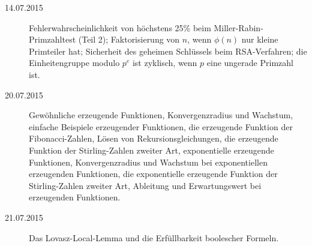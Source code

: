 \documentclass{mywork}
\begin{document}
\begin{description}
    \item[14.07.2015]
        Fehlerwahrscheinlichkeit von höchstens 25\% beim Miller-Rabin-Primzahltest (Teil 2); Faktorisierung von $n$, wenn $\phi(n)$ nur kleine Primteiler hat; Sicherheit des geheimen Schlüssels beim RSA-Verfahren; die Einheitengruppe modulo $p^e$ ist zyklisch, wenn $p$ eine ungerade Primzahl ist.
    \item[20.07.2015]
        Gewöhnliche erzeugende Funktionen, Konvergenzradius und Wachstum, einfache Beispiele erzeugender Funktionen, die erzeugende Funktion der Fibonacci-Zahlen, Lösen von Rekursionsgleichungen, die erzeugende Funktion der Stirling-Zahlen zweiter Art, exponentielle erzeugende Funktionen, Konvergenzradius und Wachstum bei exponentiellen erzeugenden Funktionen, die exponentielle erzeugende Funktion der Stirling-Zahlen zweiter Art, Ableitung und Erwartungswert bei erzeugenden Funktionen.
    \item[21.07.2015]
        Das Lovasz-Local-Lemma und die Erfüllbarkeit boolescher Formeln.
\end{description}
\end{document}
